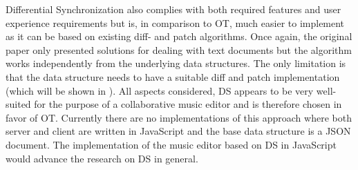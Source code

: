 Differential Synchronization also complies with both required features and user experience requirements but is, in comparison to OT, much easier to implement as it can be based on existing diff- and patch algorithms. Once again, the original paper only presented solutions for dealing with text documents but the algorithm works independently from the underlying data structures. The only limitation is that the data structure needs to have a suitable diff and patch implementation (which will be shown in ). All aspects considered, DS appears to be very well-suited for the purpose of a collaborative music editor and is therefore chosen in favor of OT. Currently there are no implementations of this approach where both server and client are written in JavaScript and the base data structure is a JSON document. The implementation of the music editor based on DS in JavaScript would advance the research on DS in general.